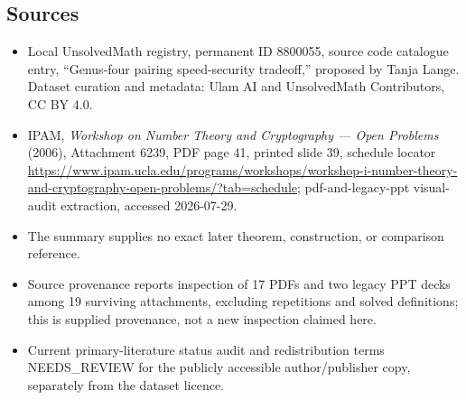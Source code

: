 \documentclass[11pt]{article}
\begin{document}
\subsection{Sources}
\begin{itemize}
\item Local UnsolvedMath registry, permanent ID 8800055, source code catalogue entry, ``Genus-four pairing speed-security tradeoff,'' proposed by Tanja Lange. Dataset curation and metadata: Ulam AI and UnsolvedMath Contributors, CC BY 4.0.
\item IPAM, \emph{Workshop on Number Theory and Cryptography --- Open Problems} (2006), Attachment 6239, PDF page 41, printed slide 39, schedule locator \url{https://www.ipam.ucla.edu/programs/workshops/workshop-i-number-theory-and-cryptography-open-problems/?tab=schedule}; pdf-and-legacy-ppt visual-audit extraction, accessed 2026-07-29.
\item The summary supplies no exact later theorem, construction, or comparison reference.
\item Source provenance reports inspection of 17 PDFs and two legacy PPT decks among 19 surviving attachments, excluding repetitions and solved definitions; this is supplied provenance, not a new inspection claimed here.
\item Current primary-literature status audit and redistribution terms NEEDS\_REVIEW for the publicly accessible author/publisher copy, separately from the dataset licence.
\end{itemize}
\end{document}
